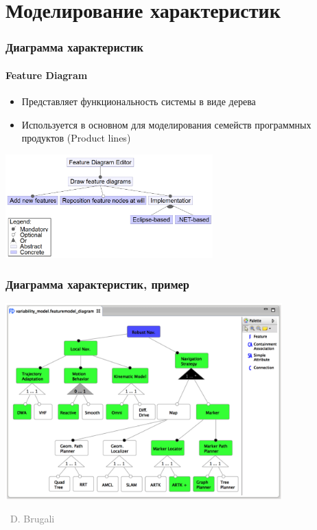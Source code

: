 \documentclass[xetex,mathserif,serif]{beamer}
\newcommand{\attribution}[1] {
	\vspace{-5mm}\begin{flushright}\begin{scriptsize}\textcolor{gray}{\textcopyright\, #1}\end{scriptsize}\end{flushright}
}
\begin{document}
	\section{Моделирование характеристик}

	\begin{frame}
		\frametitle{Диаграмма характеристик}
		\framesubtitle{Feature Diagram}
		\begin{itemize}
			\item Представляет функциональность системы в виде дерева
			\item Используется в основном для моделирования семейств программных продуктов (Product lines)
		\end{itemize}
		\begin{center}
			\includegraphics[width=0.6\textwidth]{featureDiagram.png}
		\end{center}
	\end{frame}

	\begin{frame}
		\frametitle{Диаграмма характеристик, пример}
		\begin{center}
			\includegraphics[width=0.8\textwidth]{featureDiagramExample.png}
			\attribution{D. Brugali}
		\end{center}
	\end{frame}
\end{document}
